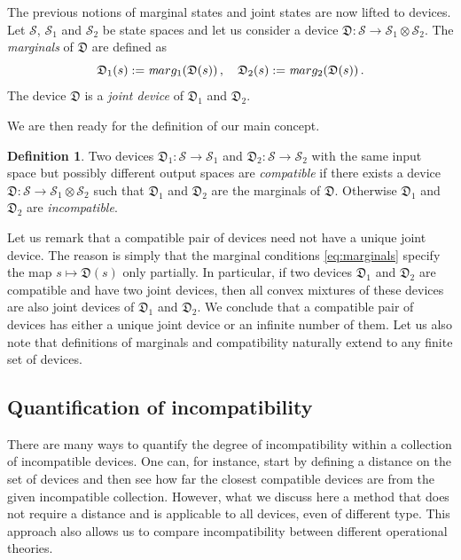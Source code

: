 \documentclass[12pt]{article}
\theoremstyle{definition}
\newtheorem*{definition*}{Definition}
\newcommand{\Dev}{\mathfrak{D}} %
\def\marg{\textit marg}
\begin{document}
The previous notions of marginal states and joint states are now lifted to devices. 
Let $\mathcal{S}$, $\mathcal{S}_1$ and $\mathcal{S}_2$ be state spaces and let us consider a device $\Dev:\mathcal{S}\to\mathcal{S}_1 \otimes \mathcal{S}_2$.
The \emph{marginals} of $\Dev$ are defined as
\begin{equation}\label{eq:marginals}
\Dev_1(s) := \marg_1(\Dev(s)) \, , \quad \Dev_2(s) := \marg_2(\Dev(s)) \, .
\end{equation}
The device $\Dev$ is a \emph{joint device} of $\Dev_1$ and $\Dev_2$.

We are then ready for the definition of our main concept.


\begin{definition*}
Two devices $\Dev_1: \mathcal{S} \to \mathcal{S}_1$ and 
$\Dev_2: \mathcal{S} \to \mathcal{S}_2$ with the same input space but possibly different output spaces are \emph{compatible} if there exists a device $\Dev: \mathcal{S} \to \mathcal{S}_1 \otimes \mathcal{S}_2$ such that $\Dev_1$ and $\Dev_2$ are the marginals of $\Dev$.
Otherwise $\Dev_1$ and $\Dev_2$ are \emph{incompatible}.
\end{definition*}

Let us remark that a compatible pair of devices need not have a unique joint device. The reason is simply that the marginal conditions \eqref{eq:marginals} specify the map $s \mapsto  \Dev(s)$ only partially. In particular, if two devices $\Dev_1$ and $\Dev_2$ are compatible and have two joint devices, then all convex mixtures of these  devices are also joint devices of $\Dev_1$ and $\Dev_2$. 
We conclude that a compatible pair of devices has either a unique joint device or an infinite number of them.  Let us also note that definitions of marginals and compatibility naturally extend to any finite set of devices. 

\subsection{Quantification of incompatibility}\label{sec:degree}

There are many ways to quantify the degree of incompatibility within a collection of incompatible devices. 
One can, for instance, start by defining a distance on the set of devices and then see how far the closest compatible devices are from the given incompatible collection.
However, what we discuss here a method that does not require a distance and is applicable to all devices, even of different type. 
This approach also allows us to compare incompatibility between different operational theories.
\end{document}
